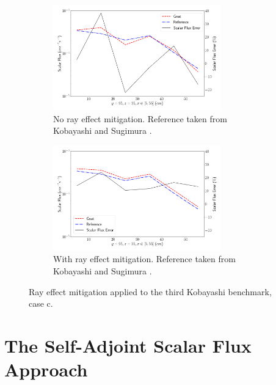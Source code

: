 \begin{figure}[H]
    \centering
    \begin{subfigure}[b]{\textwidth}
        \centering
        \includegraphics[width=0.8\textwidth]{images/verification/rt_kobayashi/kobayashi_3c_no_rt.png}
        \caption{No ray effect mitigation. Reference taken from Kobayashi and Sugimura \cite{kobayashi_benchmarks}.}
        \label{fig:verification:rt:kobayashi_3c:no_rt}
    \end{subfigure}
    \hfill
    \begin{subfigure}[b]{\textwidth}
        \centering
        \includegraphics[width=0.8\textwidth]{images/verification/rt_kobayashi/kobayashi_3c_rt.png}
        \caption{With ray effect mitigation. Reference taken from Kobayashi and Sugimura \cite{kobayashi_benchmarks}.}
        \label{fig:verification:rt:kobayashi_3c:rt}
    \end{subfigure}
    \caption{Ray effect mitigation applied to the third Kobayashi benchmark, case c.}
    \label{fig:verification:rt:kobayashi_3c}
\end{figure}
\clearpage

\section{The Self-Adjoint Scalar Flux Approach}
\label{verification:radiation_transport_sasf}

